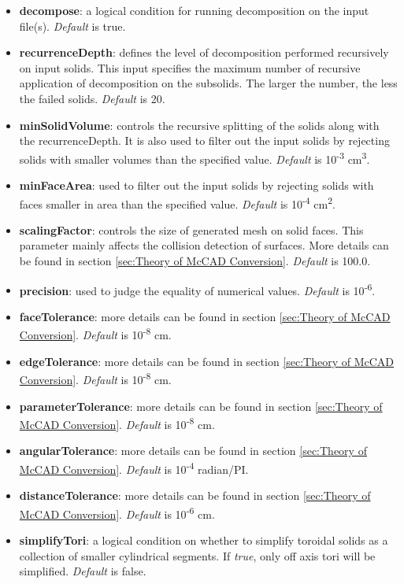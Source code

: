 \documentclass[12pt, a4paper, titlepage]{article}
\begin{document}
	\begin{itemize}
	  \item \textbf{decompose}: a logical condition for running decomposition on the input file(s). \emph{Default} is true.
	  \item \textbf{recurrenceDepth}: defines the level of decomposition performed recursively on input solids. This input specifies the maximum number of recursive application of decomposition on the subsolids. The larger the number, the less the failed solids. \emph{Default} is 20.
	  \item \textbf{minSolidVolume}: controls the recursive splitting of the solids along with the recurrenceDepth. It is also used to filter out the input solids by rejecting solids with smaller volumes than the specified value. \emph{Default} is 10\textsuperscript{-3} cm\textsuperscript{3}.
	  \item \textbf{minFaceArea}: used to filter out the input solids by rejecting solids with faces smaller in area than the specified value. \emph{Default} is 10\textsuperscript{-4} cm\textsuperscript{2}.
	  \item \textbf{scalingFactor}: controls the size of generated mesh on solid faces. This parameter mainly affects the collision detection of surfaces. More details can be found in section \ref{sec:Theory of McCAD Conversion}. \emph{Default} is 100.0.
	  \item \textbf{precision}: used to judge the equality of numerical values. \emph{Default} is 10\textsuperscript{-6}.
	  \item \textbf{faceTolerance}: more details can be found in section \ref{sec:Theory of McCAD Conversion}. \emph{Default} is 10\textsuperscript{-8} cm.
	  \item \textbf{edgeTolerance}: more details can be found in section \ref{sec:Theory of McCAD Conversion}. \emph{Default} is 10\textsuperscript{-8} cm.
	  \item \textbf{parameterTolerance}: more details can be found in section \ref{sec:Theory of McCAD Conversion}. \emph{Default} is 10\textsuperscript{-8} cm.
	  \item \textbf{angularTolerance}: more details can be found in section \ref{sec:Theory of McCAD Conversion}. \emph{Default} is 10\textsuperscript{-4} radian/PI.
	  \item \textbf{distanceTolerance}: more details can be found in section \ref{sec:Theory of McCAD Conversion}. \emph{Default} is 10\textsuperscript{-6} cm.
	  \item \textbf{simplifyTori}: a logical condition on whether to simplify toroidal solids as a collection of smaller cylindrical segments. If \emph{true}, only off axis tori will be simplified. \emph{Default} is false.

\end{itemize}
\end{document}
